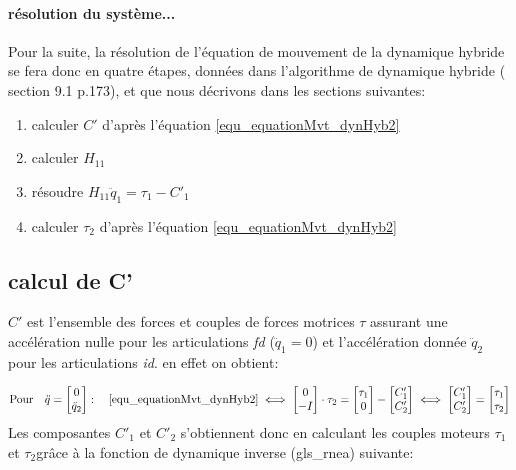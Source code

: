 \documentclass{report}
\begin{document}
\paragraph{résolution du système...}
Pour la suite, la résolution de l'équation de mouvement de la dynamique hybride se fera donc en quatre étapes, données dans l'algorithme de dynamique hybride (\cite{bib_featherstone} section 9.1 p.173), et que nous décrivons dans les sections suivantes:
\begin{enumerate}
\item calculer $C'$ d'après l'équation \eqref{equ_equationMvt_dynHyb2}
\item calculer $H_{11}$
\item résoudre $H_{11} \ddot{q}_1 = \tau_1 - C'_1$
\item calculer $\tau_2$ d'après l'équation \eqref{equ_equationMvt_dynHyb2}
\end{enumerate}


\subsection{calcul de C'}

$C'$ est l'ensemble des forces et couples de forces motrices $\tau$ assurant une accélération nulle pour les articulations \emph{fd} ($\ddot{q}_1=0$) et l'accélération donnée $\ddot{q}_2$ pour les articulations \emph{id}. en effet on obtient:

\begin{equation}
\textnormal{Pour} \quad \ddot{q}=
\begin{bmatrix}
  0 \\
  \ddot{q}_2
\end{bmatrix}
: \quad
\eqref{equ_equationMvt_dynHyb2} \iff
\begin{bmatrix}
  0 \\
  -I
\end{bmatrix} 
\cdot \tau_2
=
\begin{bmatrix}
  \tau_1 \\
  0
\end{bmatrix} 
-
\begin{bmatrix}
  C'_1 \\
  C'_2
\end{bmatrix}
\iff
\begin{bmatrix}
  C'_1 \\
  C'_2
\end{bmatrix}
=
\begin{bmatrix}
  \tau_1 \\
  \tau_2
\end{bmatrix} 
\end{equation}
\medskip
Les composantes $C'_1$ et $C'_2$ s'obtiennent donc en calculant les couples moteurs $\tau_1$ et $\tau_2$\footnotemark[2]grâce à la fonction de dynamique inverse (\gls{gls_rnea}) suivante:
\end{document}
